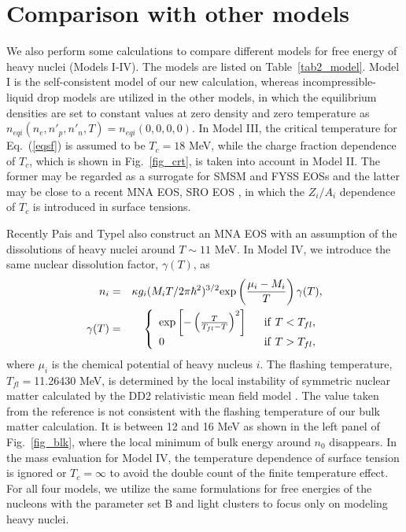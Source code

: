 \documentclass[preprint]{revtex4}
\begin{document}
{{\section{Comparison with other models  \label{sec:res2}}
{%
We also perform some calculations to compare different models for free energy of heavy nuclei (Models I-IV).
The models are listed on Table~\ref{tab2_model}.
Model I is the self-consistent model of our new calculation, 
whereas incompressible-liquid drop models are utilized in the other models,
in which the equilibrium densities are set to constant values at zero density and zero temperature as $n_{eqi}(n_e,n'_p,n'_n,T)=n_{eqi}(0,0,0,0)$.
In Model III,  the critical temperature for Eq.~(\ref{eqsf})  is assumed to be $T_c=18$ MeV, while
the charge fraction dependence of $T_c$, which is shown in Fig.~\ref{fig_crt}, is taken into account in Model II.
The former may be regarded as a surrogate for SMSM and FYSS EOSs and 
the latter may be close to a recent MNA EOS, SRO EOS \cite{schneider17}, in which 
 the $Z_i/A_i$ dependence of $T_c$  is introduced in surface tensions.}

{%
Recently Pais and Typel \cite{pais16} also construct an MNA EOS with an assumption of the dissolutions of heavy nuclei around $T\sim11$ MeV.
In Model IV, we introduce the same nuclear dissolution factor, $\gamma(T)$, as 
\begin{eqnarray}
n_i&=&\kappa}{g_{i} (M_{i} T/2\pi \hbar ^2 )^{3/2}  {\rm exp} \left( \frac{\mu_i-M_i}{T} \right) \gamma(T) ,  \label{eq:flush} \\
 \gamma(T)&=& \left\{ \begin{array}{ll}
  {\rm exp}\left[ -\left( \frac{T}{T_{fl}-T} \right)^2 \right] \ \ &  {\rm{if}} \   T<  T_{fl},   \\
 0 \ \   &  {\rm if}  \ T> T_{fl},  \label{eq:fla} 
\end{array} \right.
\end{eqnarray}
where $\mu_i$ is the chemical potential of heavy nucleus $i$.     
The flashing temperature, $T_{fl}=$11.26430 MeV, is determined by the local instability of symmetric nuclear matter calculated by the DD2 relativistic mean field model \cite{typel10}.
The value taken from the reference \cite{pais16} is not  consistent with the flashing temperature %
 of our bulk matter calculation.
It is between 12 and 16 MeV as shown in the left panel of Fig.~\ref{fig_blk}, where the local  minimum of  bulk energy around $n_0$ disappears.
In the mass evaluation for Model IV, the temperature dependence of surface tension is ignored or $T_c=\infty$ to avoid the double count of the finite temperature effect.
For all four models, we utilize the same formulations for free energies of the nucleons  with the parameter set B  and light clusters to focus only on modeling heavy nuclei.}

}}
\end{document}

